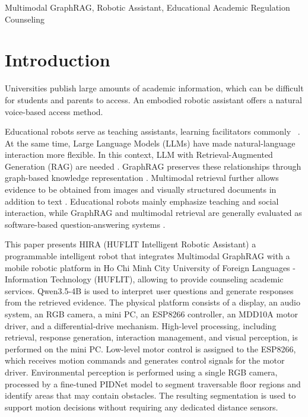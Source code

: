\documentclass[conference]{IEEEtran}
\begin{document}
\begin{IEEEkeywords}
    Multimodal GraphRAG, Robotic Assistant, Educational Academic Regulation Counseling
\end{IEEEkeywords}

\section{Introduction}\label{sec1}

Universities publish large amounts of academic information, which can be difficult for students and parents to access. An embodied robotic assistant offers a natural voice-based access method.

Educational robots serve as teaching assistants, learning
facilitators commonly ~\cite{rosenbergkima2020rscl,donnermann2024integration,donnermann2025highereducation,budagov2026robotta}.
At the same time, Large Language Models (LLMs) have made natural-language
interaction more flexible. In this context, LLM with Retrieval-Augmented Generation (RAG) are needed \cite{lewis2020rag}. GraphRAG preserves these relationships through
graph-based knowledge representation \cite{edge2024graphrag,he2024gretriever,ma2025thinkongraph}. Multimodal
retrieval further allows evidence to be obtained from images and visually
structured documents in addition to
text \cite{chen2022murag,yasunaga2023retrieval,yu2025visrag}. Educational robots mainly emphasize teaching and social
interaction, while GraphRAG and multimodal retrieval are generally evaluated as
software-based question-answering systems \cite{ahn2022saycan,driess2023palme,zitkovich2023rt2}.

This paper presents HIRA (HUFLIT Intelligent Robotic Assistant) a programmable intelligent robot that integrates Multimodal
GraphRAG with a mobile robotic platform in Ho Chi Minh City University of Foreign Languages - Information Technology (HUFLIT), allowing to provide counseling academic services. Qwen3.5-4B \cite{qwen2026qwen35} is used to interpret user questions
and generate responses from the retrieved evidence. The physical platform consists of a display, an audio system, an RGB camera, a
mini PC, an ESP8266 controller, an MDD10A motor driver, and a differential-drive
mechanism. High-level processing, including retrieval, response generation,
interaction management, and visual perception, is performed on the mini PC\@.
Low-level motor control is assigned to the ESP8266, which receives motion
commands and generates control signals for the motor driver. Environmental perception is performed using a single RGB camera, processed by a fine-tuned PIDNet model \cite{xu2023pidnet} to segment
traversable floor regions and identify areas that may contain obstacles. The
resulting segmentation is used to support motion decisions without requiring any dedicated distance sensors.
\end{document}
